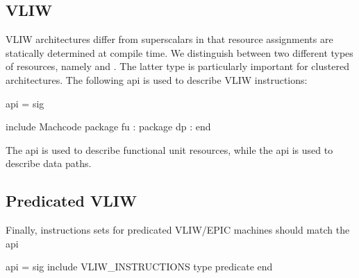 \subsection{VLIW}
   VLIW architectures differ from superscalars in that
resource assignments are statically determined at compile time.
We distinguish between two different types of resources, namely
 and .  
The latter type is particularly
important for clustered architectures.
The following api
is used to describe VLIW instructions:
\begin{SML}
api  =
sig

   include Machcode
   package fu : 
   package dp : 
end
\end{SML}
The api  is used to describe functional unit
resources, while the api  is used to describe
data paths.

\subsection{Predicated VLIW}

Finally, instructions sets for predicated VLIW/EPIC machines should match
the api 
\begin{SML}
api  =
sig
   include VLIW_INSTRUCTIONS
   type predicate
end
\end{SML}
